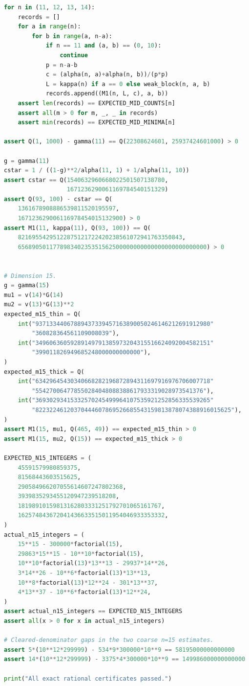 \documentclass[11pt]{article}
\theoremstyle{definition}
\newcommand{\1}{\mathbf{1}}
\begin{document}
\begin{lstlisting}[style=audit,language=Python]
for n in (11, 12, 13, 14):
    records = []
    for a in range(n):
        for b in range(a, n-a):
            if n == 11 and (a, b) == (0, 10):
                continue
            p = n-a-b
            c = (alpha(n, a)+alpha(n, b))/(p*p)
            L = kappa(n) if a == 0 else weak_block(n, a, b)
            records.append((M1(n, L, c), a, b))
    assert len(records) == EXPECTED_MID_COUNTS[n]
    assert all(m > 0 for m, _, _ in records)
    assert min(records) == EXPECTED_MID_MINIMA[n]

assert Q(1, 1000) - gamma(11) == Q(22308624601, 25937424601000) > 0

g = gamma(11)
cstar = 1 / ((1-g)**2/alpha(11, 1) + 1/alpha(11, 10))
assert cstar == Q(1540632960668022501507138780,
                  1671236290061169784540151329)
assert Q(93, 100) - cstar == Q(
    1361678908886539811520195597,
    167123629006116978454015132900) > 0
assert M1(11, kappa(11), Q(93, 100)) == Q(
    82169554295122875121722420238561072941763350843,
    656890501177898340235351562500000000000000000000000000) > 0


# Dimension 15.
g = gamma(15)
mu1 = v(14)*G(14)
mu2 = v(13)*G(13)**2
expected_m15_thin = Q(
    int("93713344067889437339457163890050246146212691912980"
        "360828364561109008039"),
    int("34960636059289149791385973204315516624092004582151"
        "399011826949685248000000000000"),
)
expected_m15_thick = Q(
    int("63429645430340668282196872894311697916976706007718"
        "554270064778550284048088388617933319028973541376"),
    int("36930293415332570245499964107535921252856335539265"
        "82232246120370444607869526685543159813878074388916015625"),
)
assert M1(15, mu1, Q(465, 49)) == expected_m15_thin > 0
assert M1(15, mu2, Q(15)) == expected_m15_thick > 0

EXPECTED_N15_INTEGERS = (
    45591579980859375,
    81568443603515625,
    290584966207055614607247802368,
    3939835293455120947239518208,
    18198910159813162803331251792701065161767,
    162574843672041436633515011954046933353332,
)
actual_n15_integers = (
    15**15 - 300000*factorial(15),
    29863*15**15 - 10**10*factorial(15),
    10**10*factorial(13)*13**13 - 29937*14**26,
    3*14**26 - 10**6*factorial(13)*13**13,
    10**8*factorial(13)*12**24 - 301*13**37,
    4*13**37 - 10**6*factorial(13)*12**24,
)
assert actual_n15_integers == EXPECTED_N15_INTEGERS
assert all(x > 0 for x in actual_n15_integers)

# Cleared-denominator gaps in the two coarse n=15 estimates.
assert 5*(10**12*299999) - 534*9*300000*10**9 == 58195000000000000
assert 14*(10**12*299999) - 3375*4*300000*10**9 == 149986000000000000

print("All exact rational certificates passed.")
\end{lstlisting}
\end{document}

